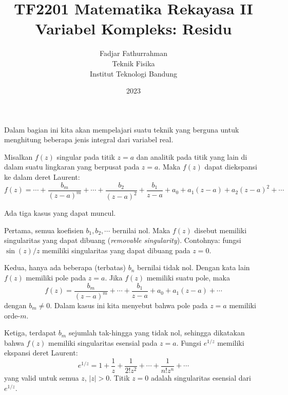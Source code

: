 



\title{%
{\small TF2201 Matematika Rekayasa II}\\
Variabel Kompleks: Residu
}
\author{Fadjar Fathurrahman\\
Teknik Fisika\\
Institut Teknologi Bandung}
\date{2023}
\maketitle

Dalam bagian ini kita akan mempelajari suatu teknik yang berguna untuk
menghitung beberapa jenis integral dari variabel real.

Misalkan $f(z)$ singular pada titik $z=a$ dan analitik pada titik
yang lain di dalam suatu lingkaran yang berpusat pada $z=a$. Maka
$f(z)$ dapat diekspansi ke dalam deret Laurent:
\begin{equation*}
f(z) = \cdots + \frac{b_{m}}{(z-a)^{m}} + \cdots + \frac{b_{2}}{(z-a)^{2}} +
\frac{b_{1}}{z-a}+a_{0}+a_{1}(z-a)+a_{2}(z-a)^{2}+\cdots
\end{equation*}

Ada tiga kasus yang dapat muncul.

Pertama, semua koefisien $b_{1},b_{2},\cdots$ bernilai nol. Maka
$f(z)$ disebut memiliki singularitas yang dapat dibuang (\textit{removable singularity}).
Contohnya: fungsi $\sin(z)/z$ memiliki singularitas yang dapat
dibuang pada $z=0$.

Kedua, hanya ada beberapa (terbatas) \textbf{$b_{n}$} bernilai tidak
nol. Dengan kata lain $f(z)$ memiliki pole pada $z=a$. Jika $f(z)$ memiliki
suatu pole, maka
\begin{equation*}
f(z)=\frac{b_{m}}{(z-a)^{m}}+\cdots+\frac{b_{1}}{z-a}+a_{0}+a_{1}(z-a)+\cdots
\end{equation*}
dengan $b_{m}\neq0$.
Dalam kasus ini kita menyebut bahwa pole pada $z=a$ memiliki orde-$m$.

Ketiga, terdapat $b_{m}$ sejumlah tak-hingga yang tidak nol, sehingga
dikatakan bahwa $f(z)$ memiliki singularitas esensial pada $z=a$.
Fungsi $e^{1/z}$ memiliki ekspansi deret Laurent:
\begin{equation*}
e^{1/z} = 1 + \frac{1}{z} + \frac{1}{2!z^{2}} + \cdots + \frac{1}{n!z^{n}}+\cdots
\end{equation*}
yang valid untuk semua $z$, $|z|>0$. Titik $z = 0$ adalah singularitas
esensial dari $e^{1/z}$.

